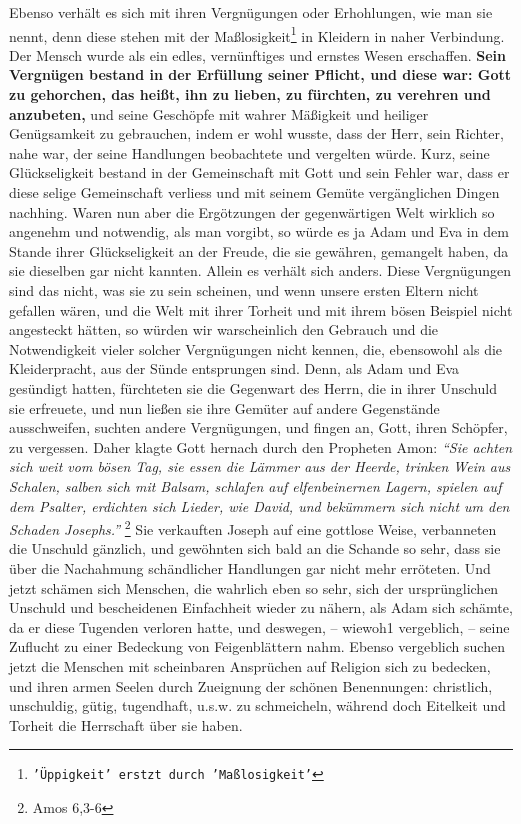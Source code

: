 Ebenso verhält es sich mit ihren Vergnügungen oder Erhohlungen, wie man sie
nennt, denn diese stehen mit der 
Maßlosigkeit\footnote{\texttt{'Üppigkeit' erstzt durch 'Maßlosigkeit'}} in Kleidern in naher 
Verbindung. Der
Mensch wurde als ein edles, vernünftiges und ernstes Wesen erschaffen. \textbf{Sein
Vergnügen bestand in der Erfüllung seiner Pflicht, und diese war: Gott zu
gehorchen, das heißt, ihn zu lieben, zu fürchten, zu verehren und anzubeten,} und
seine Geschöpfe mit wahrer Mäßigkeit und heiliger Genügsamkeit zu gebrauchen,
indem er wohl wusste, dass der Herr, sein Richter, nahe war, der seine Handlungen
beobachtete und vergelten würde. Kurz, seine Glückseligkeit bestand in der
Gemeinschaft mit Gott und sein Fehler war, dass er diese selige Gemeinschaft
verliess und mit seinem Gemüte vergänglichen Dingen nachhing. Waren nun aber
die Ergötzungen der gegenwärtigen Welt wirklich so angenehm und notwendig, als
man vorgibt, so würde es ja Adam und Eva in dem Stande ihrer Glückseligkeit an
der Freude, die sie gewähren, gemangelt haben, da sie dieselben gar nicht
kannten. Allein es verhält sich anders. Diese Vergnügungen sind das nicht, was
sie zu sein scheinen, und wenn unsere ersten Eltern nicht gefallen wären, und
die Welt mit ihrer Torheit und mit ihrem bösen Beispiel nicht angesteckt
hätten, so würden wir warscheinlich den Gebrauch und die Notwendigkeit vieler
solcher Vergnügungen nicht kennen, die, ebensowohl als die Kleiderpracht, aus
der Sünde entsprungen sind.  Denn, als Adam und Eva gesündigt hatten, fürchteten
sie die Gegenwart des Herrn, die in ihrer Unschuld sie erfreuete, und nun ließen
sie ihre Gemüter auf andere Gegenstände ausschweifen, suchten andere
Vergnügungen, und fingen an, Gott, ihren Schöpfer, zu vergessen. Daher klagte
Gott hernach durch den Propheten Amon:
\textit{"`Sie achten sich weit vom bösen Tag,
sie essen die Lämmer aus der Heerde, trinken Wein aus Schalen, salben sich mit
Balsam, schlafen auf elfenbeinernen Lagern, spielen auf dem Psalter, erdichten
sich Lieder, wie David, und bekümmern sich nicht um den Schaden
Josephs."'}
\footnote{Amos 6,3-6}
Sie verkauften Joseph auf eine gottlose
Weise, verbanneten die Unschuld gänzlich, und gewöhnten sich bald an die Schande
so sehr, dass sie über die Nachahmung schändlicher Handlungen gar nicht mehr
erröteten. Und jetzt schämen sich Menschen, die wahrlich eben so sehr, sich der
ursprünglichen Unschuld und bescheidenen Einfachheit wieder zu nähern, als Adam
sich schämte, da er diese Tugenden verloren hatte, und deswegen, -- wiewoh1
vergeblich, -- seine Zuflucht zu einer Bedeckung von Feigenblättern nahm. Ebenso 
vergeblich suchen jetzt die Menschen mit scheinbaren Ansprüchen auf Religion
sich zu bedecken, und ihren armen Seelen durch Zueignung der schönen
Benennungen: christlich, unschuldig, gütig, tugendhaft, u.s.w. zu schmeicheln,
während doch Eitelkeit und Torheit die Herrschaft über sie haben.

